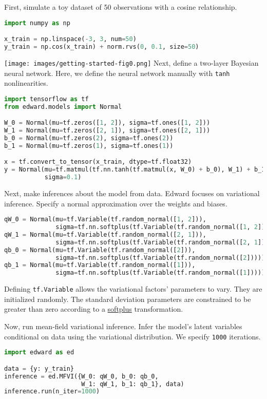 First, simulate a toy dataset of 50 observations with a cosine relationship.
\begin{lstlisting}[language=Python]
import numpy as np

x_train = np.linspace(-3, 3, num=50)
y_train = np.cos(x_train) + norm.rvs(0, 0.1, size=50)
\end{lstlisting}
\texttt{[image: images/getting-started-fig0.png]}
Next, define a two-layer Bayesian neural network. Here, we
define the neural network manually with \texttt{tanh} nonlinearities.
\begin{lstlisting}[language=Python]
import tensorflow as tf
from edward.models import Normal

W_0 = Normal(mu=tf.zeros([1, 2]), sigma=tf.ones([1, 2]))
W_1 = Normal(mu=tf.zeros([2, 1]), sigma=tf.ones([2, 1]))
b_0 = Normal(mu=tf.zeros(2), sigma=tf.ones(2))
b_1 = Normal(mu=tf.zeros(1), sigma=tf.ones(1))

x = tf.convert_to_tensor(x_train, dtype=tf.float32)
y = Normal(mu=tf.matmul(tf.nn.tanh(tf.matmul(x, W_0) + b_0), W_1) + b_1,
           sigma=0.1)
\end{lstlisting}
Next, make inferences about the model from data.
Edward focuses on variational inference. Specify a normal
approximation over the weights and biases.
\begin{lstlisting}[language=Python]
qW_0 = Normal(mu=tf.Variable(tf.random_normal([1, 2])),
              sigma=tf.nn.softplus(tf.Variable(tf.random_normal([1, 2]))))
qW_1 = Normal(mu=tf.Variable(tf.random_normal([2, 1])),
              sigma=tf.nn.softplus(tf.Variable(tf.random_normal([2, 1]))))
qb_0 = Normal(mu=tf.Variable(tf.random_normal([2])),
              sigma=tf.nn.softplus(tf.Variable(tf.random_normal([2]))))
qb_1 = Normal(mu=tf.Variable(tf.random_normal([1])),
              sigma=tf.nn.softplus(tf.Variable(tf.random_normal([1]))))
\end{lstlisting}
Defining \texttt{tf.Variable} allows the variational factors'
parameters to vary. They are initialized randomly.  The standard
deviation parameters are constrained to be greater than zero according
to a
\href{https://en.wikipedia.org/wiki/Rectifier_(neural_networks)}{softplus}
transformation.

Now, run mean-field variational inference. Infer the model's latent variables
conditional on data using the variational distribution.
We specify \texttt{1000} iterations.
\begin{lstlisting}[language=Python]
import edward as ed

data = {y: y_train}
inference = ed.MFVI({W_0: qW_0, b_0: qb_0,
                     W_1: qW_1, b_1: qb_1}, data)
inference.run(n_iter=1000)
\end{lstlisting}

